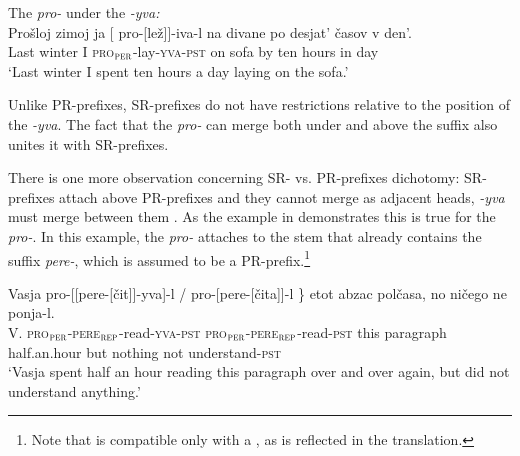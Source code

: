 \documentclass[output=paper,colorlinks,citecolor=brown,newtxmath]{langsci/langscibook}
\begin{document}
\ea The  \textit{pro-} under the  \textit{-yva:}\label{ex:naumov:17}\smallskip\\
    \gll Prošloj	zimoj	ja	[\hspace{-2pt} pro-[lež]]-iva-l	na	divane	po	desjat’ časov	v	den’.\\
    Last	winter	I	{} \textsc{pro}$_\textsc{per}$-lay-\textsc{yva}-\textsc{pst}	on	sofa	by	ten hours	in	day \\
    \glt `Last winter I spent ten hours a day laying on the sofa.'
    \z


\noindent Unlike PR-prefixes, SR-prefixes do not have restrictions relative to the position of the  \textit{-yva}. The fact that the  \textit{pro-} can merge both under and above the suffix also unites it with SR-prefixes.


There is one more observation concerning SR- vs. PR-prefixes dichotomy: SR-prefixes attach above PR-prefixes and they cannot merge as adjacent heads, \textit{-yva} must merge between them \citep{tatevosov2009mnozestvennaja,tatevosov2013mnozestvennaja}. As the example in  demonstrates this is true for the  \textit{pro-}. In this example, the  \textit{pro-} attaches to the stem that already contains the  suffix \textit{pere-}, which is assumed to be a PR-prefix.\footnote{Note that  is compatible only with a , as is reflected in the translation.}

\ea \label{ex:naumov:18}
\gll Vasja	\minsp{\{} pro-[[pere-[čit]]-yva]-l / \minsp{*} pro-[pere-[čita]]-l	\} etot	abzac polčasa,	no 	ničego		ne	ponja-l. \\
V. {} \textsc{pro}$_\textsc{per}$-\textsc{pere}$_\textsc{rep}$-read-\textsc{yva}-\textsc{pst} {} {} \textsc{pro}$_\textsc{per}$-\textsc{pere}$_\textsc{rep}$-read-\textsc{pst}		{} 	this	paragraph	half.an.hour	but	nothing	not	understand-\textsc{pst} \\
\glt `Vasja spent half an hour reading this paragraph over and over again, but did not understand anything.'
\z
\end{document}
